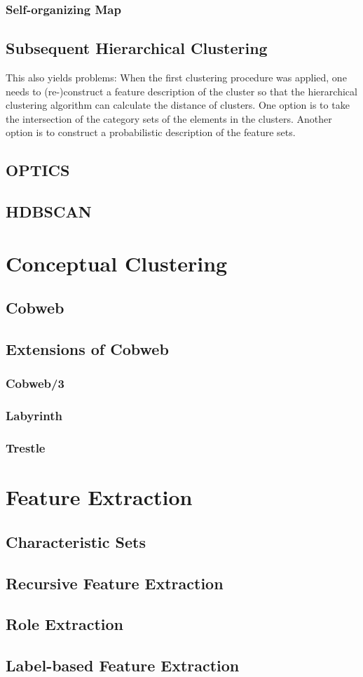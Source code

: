 \subsubsection{Self-organizing Map}\label{\positionnumber}

\subsection{Subsequent Hierarchical Clustering}
This also yields problems: When the first clustering procedure was applied, one needs to (re-)construct a feature description of the cluster so that the hierarchical clustering algorithm can calculate the distance of clusters. One option is to take the intersection of the category sets of the elements in the clusters. Another option is to construct a probabilistic description  of the feature sets. 

\subsection{OPTICS}\label{\positionnumber}
\subsection{HDBSCAN}\label{\positionnumber}



\section{Conceptual Clustering}
\subsection{Cobweb}\label{\positionnumber}
\subsection{Extensions of Cobweb}
\subsubsection{Cobweb/3}
\subsubsection{Labyrinth}
\subsubsection{Trestle}


\section{Feature Extraction}
\subsection{Characteristic Sets}
\subsection{Recursive Feature Extraction}
\subsection{Role Extraction}
\subsection{Label-based Feature Extraction}